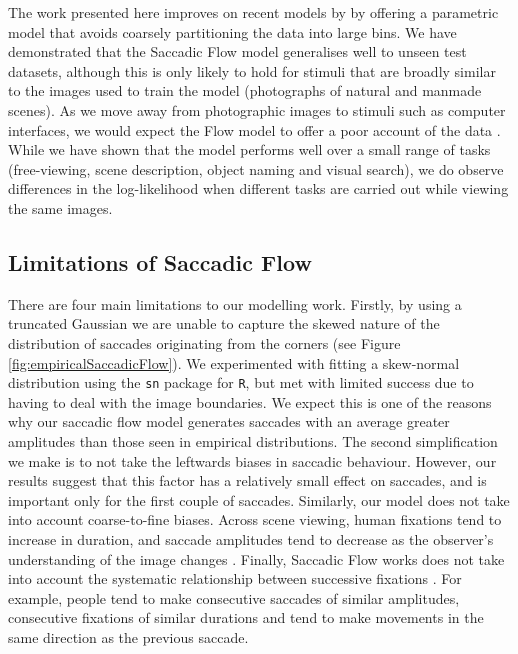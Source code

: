 \documentclass[a4paper, twocolumn, oneside, 11pt]{article}
\begin{document}
The work presented here improves on recent models by \cite{clarke2016,leMeur-coutrot2016} by offering a parametric model that avoids coarsely partitioning the data into large bins. We have demonstrated that the Saccadic Flow model generalises well to unseen test datasets, although this is only likely to hold for stimuli that are broadly similar to the images used to train the model (photographs of natural and manmade scenes). As we move away from photographic images to stimuli such as computer interfaces, we would expect the Flow model to offer a poor account of the data \citep{leMeur-coutrot2016}. While we have shown that the model performs well over a small range of tasks (free-viewing, scene description, object naming and visual search), we do observe differences in the log-likelihood when different tasks are carried out while viewing the same images. 

\subsection{Limitations of Saccadic Flow}
There are four main limitations to our modelling work. Firstly, by using a truncated Gaussian we are unable to capture the skewed nature of the distribution of saccades originating from the corners (see Figure  \ref{fig:empiricalSaccadicFlow}). We experimented with fitting a skew-normal distribution using the \texttt{sn} package for \texttt{R}, but met with limited success due to having to deal with the image boundaries. We expect this is one of the reasons why our saccadic flow model generates saccades with an average greater amplitudes than those seen in empirical distributions.  The second simplification we make is to not take the leftwards biases in saccadic behaviour. However, our results suggest that this factor has a relatively small effect on saccades, and is important only for the first couple of saccades. Similarly, our model does not take into account coarse-to-fine biases. Across scene viewing, human fixations tend to increase in duration, and saccade amplitudes tend to decrease as the observer's understanding of the image changes \citep{antes1974}. Finally, Saccadic Flow works does not take into account the systematic relationship between successive fixations \citep{tatler2008}. For example, people tend to make consecutive saccades of similar amplitudes, consecutive fixations of similar durations and tend to make movements in the same direction as the previous saccade. 
\end{document}
